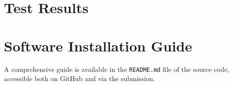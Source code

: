 \documentclass[a4paper]{report}
\begin{document}
\begin{appendices}
	\chapter{Test Results}
	


	\chapter{Software Installation Guide}
	A comprehensive guide is available in the \texttt{README.md} file of the source code, accessible both on GitHub and via the submission.
\end{appendices}
\end{document}
